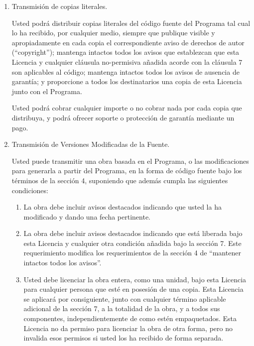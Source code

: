 \documentclass[11pt]{article}
\begin{document}
\begin{enumerate}
\item Transmisi\'{o}n de copias literales.

Usted podr\'{a} distribuir copias literales del c\'{o}digo fuente del 
Programa tal cual lo ha recibido, por cualquier medio, siempre que 
publique visible y apropiadamente en cada copia el correspondiente 
aviso de derechos de autor (``copyright''); mantenga intactos todos los avisos que establezcan 
que esta Licencia y cualquier cl\'{a}usula no-permisiva a\~nadida acorde con 
la cl\'{a}usula 7 son aplicables al c\'{o}digo; mantenga intactos todos los 
avisos de ausencia de garant\'{i}a; y proporcione a todos los destinatarios 
una copia de esta Licencia junto con el Programa.

Usted podr\'{a} cobrar cualquier importe o no cobrar nada por cada copia 
que distribuya, y podr\'{a} ofrecer soporte o protecci\'{o}n de garant\'{i}a 
mediante un pago.

\item Transmisi\'{o}n de Versiones Modificadas de la Fuente.

Usted puede transmitir una obra basada en el Programa, o las 
modificaciones para generarla a partir del Programa, en la forma de 
c\'{o}digo fuente bajo los t\'{e}rminos de la secci\'{o}n 4, suponiendo que adem\'{a}s 
cumpla las siguientes condiciones:

  \begin{enumerate}
  \item La obra debe incluir avisos destacados indicando que usted la ha 
  modificado y dando una fecha pertinente.

  \item La obra debe incluir avisos destacados indicando que est\'{a} 
  liberada bajo esta Licencia y cualquier otra condici\'{o}n a\~nadida bajo 
  la secci\'{o}n 7.  Este requerimiento modifica los requerimientos de la 
  secci\'{o}n 4 de ``mantener intactos todos los avisos''.

  \item Usted debe licenciar la obra entera, como una unidad, bajo esta 
  Licencia para cualquier persona que est\'{e} en posesi\'{o}n de una copia.  
  Esta Licencia se aplicar\'{a} por consiguiente, junto con cualquier 
  t\'{e}rmino aplicable adicional de la secci\'{o}n 7, a la totalidad de la 
  obra, y a todos sus componentes, independientemente de como est\'{e}n 
  empaquetados. Esta Licencia no da permiso para licenciar la obra de 
  otra forma, pero no invalida esos permisos si usted los ha recibido 
  de forma separada.


\end{enumerate}
\end{enumerate}
\end{document}
